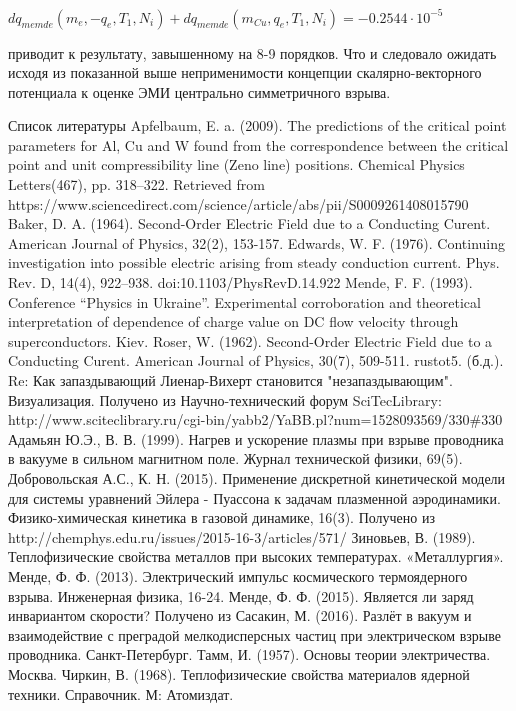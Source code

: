 ﻿\documentclass{article}
\begin{document}
$d{{q}_{memde}}({{m}_{e}},-{{q}_{e}},{{T}_{1}},{{N}_{i}})+d{{q}_{memde}}({{m}_{Cu}},{{q}_{e}},{{T}_{1}},{{N}_{i}})=-0.2544\cdot {{10}^{-5}}\ $

приводит к результату, завышенному на 8-9 порядков. Что и следовало ожидать исходя из показанной выше неприменимости концепции скалярно-векторного потенциала к оценке ЭМИ центрально симметричного взрыва.



Список литературы
Apfelbaum, E. a. (2009). The predictions of the critical point parameters for Al, Cu and W found from the correspondence between the critical point and unit compressibility line (Zeno line) positions. Chemical Physics Letters(467), pp. 318–322. Retrieved from https://www.sciencedirect.com/science/article/abs/pii/S0009261408015790 
Baker, D. A. (1964). Second-Order Electric Field due to a Conducting Curent. American Journal of Physics, 32(2), 153-157.
Edwards, W. F. (1976). Continuing investigation into possible electric arising from steady conduction current. Phys. Rev. D, 14(4), 922--938. doi:10.1103/PhysRevD.14.922
Mende, F. F. (1993). Conference “Physics in Ukraine”. Experimental corroboration and theoretical interpretation of dependence of charge value on DC flow velocity through superconductors. Kiev.
Roser, W. (1962). Second-Order Electric Field due to a Conducting Curent. American Journal of Physics, 30(7), 509-511.
rustot5. (б.д.). Re: Как запаздывающий Лиенар-Вихерт становится "незапаздывающим". Визуализация. Получено из Научно-технический форум SciTecLibrary: http://www.sciteclibrary.ru/cgi-bin/yabb2/YaBB.pl?num=1528093569/330\#330
Адамьян Ю.Э., В. В. (1999). Нагрев и ускорение плазмы при взрыве проводника в вакууме в сильном магнитном поле. Журнал технической физики, 69(5).
Добровольская А.С., К. Н. (2015). Применение дискретной кинетической модели для системы уравнений Эйлера - Пуассона к задачам плазменной аэродинамики. Физико-химическая кинетика в газовой динамике, 16(3). Получено из http://chemphys.edu.ru/issues/2015-16-3/articles/571/
Зиновьев, В. (1989). Теплофизические свойства металлов при высоких температурах. «Металлургия».
Менде, Ф. Ф. (2013). Электрический импульс космического термоядерного взрыва. Инженерная физика, 16-24.
Менде, Ф. Ф. (2015). Является ли заряд инвариантом скорости? Получено из %
Сасакин, М. (2016). Разлёт в вакуум и взаимодействие с преградой мелкодисперсных частиц при электрическом взрыве проводника. Санкт-Петербург.
Тамм, И. (1957). Основы теории электричества. Москва.
Чиркин, В. (1968). Теплофизические свойства материалов ядерной техники. Справочник. М: Атомиздат.
\end{document}
